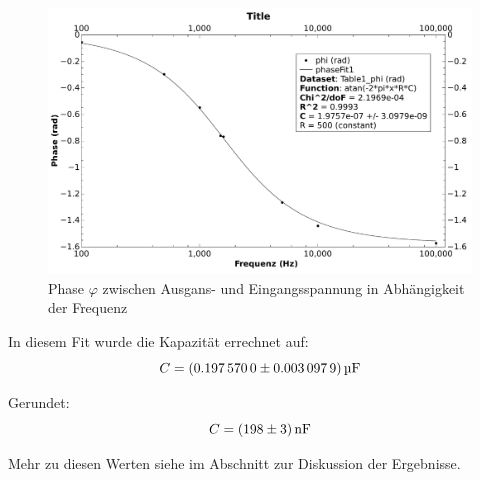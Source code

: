 \begin{figure}[th!]
    \centering
    \includegraphics[width=.8\textwidth]{images/aufgabe5-phase.pdf}
    \caption{Phase $\varphi$ zwischen Ausgans- und Eingangsspannung in Abh\"angigkeit der Frequenz}
    \label{fig:rcglied:phase}
\end{figure}

In diesem Fit wurde die Kapazit\"at errechnet auf:
\begin{equation*}
    C = \SI[separate-uncertainty = true]{0.19757 \pm 0.0030979}{\micro\farad}
\end{equation*}

Gerundet:
\begin{equation*}
    C = \SI[separate-uncertainty = true]{198 \pm 3}{\nano\farad}
\end{equation*}

Mehr zu diesen Werten siehe im Abschnitt zur Diskussion der Ergebnisse.
